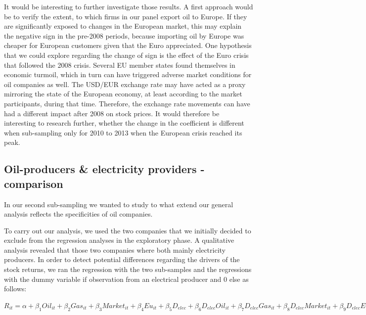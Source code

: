 \documentclass[a4paper]{article}
\begin{document}
It would be interesting to further investigate those results. A first approach would be to verify the extent, to which firms in our panel export oil to Europe. If they are significantly exposed to changes in the European market, this may explain the negative sign in the pre-2008 periods, because importing oil by Europe was cheaper for European customers given that the Euro appreciated. One hypothesis that we could explore regarding the change of sign is the effect of the Euro crisis that followed the 2008 crisis. Several EU member states found themselves in economic turmoil, which in turn can have triggered adverse market conditions for oil companies as well. The USD/EUR exchange rate may have acted as a proxy mirroring the state of the European economy, at least according to the market participants, during that time. Therefore, the exchange rate movements can have had a different impact after 2008 on stock prices. It would therefore be interesting to research further, whether the change in the coefficient is different when sub-sampling only for 2010 to 2013 when the European crisis reached its peak.

\subsection{Oil-producers \& electricity providers - comparison}

In our second sub-sampling we wanted to study to what extend our general analysis reflects the specificities of oil companies. 

To carry out our analysis, we used the two companies that we initially decided to exclude from the regression analyses in the exploratory phase. A qualitative analysis revealed that those two companies where both mainly electricity producers. In order to detect potential differences regarding the drivers of the stock returns, we ran the regression with the two sub-samples and the regressions with the dummy variable if observation from an electrical producer and 0 else as follows:

$R_{it}=\alpha + \beta_{1}Oil_{it} + \beta_{2}Gas_{it} + \beta_{3}Market_{it} + \beta_{4}Eu_{it}+ \beta_{5}D_{elec} + \beta_{6}D_{elec}Oil_{it} + \beta_{7}D_{elec}Gas_{it} + \beta_{8}D_{elec}Market_{it} + \beta_{9}D_{elec}Eu_{it} + \mu_{i} + \epsilon_{it}$
\end{document}
